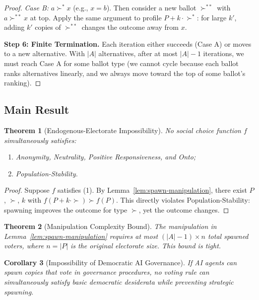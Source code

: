 \documentclass[12pt]{article}
\newtheorem{theorem}{Theorem}[section]
\newtheorem{corollary}[theorem]{Corollary}
\begin{document}
\begin{proof}
\textit{Case B:} $a \succ^* x$ (e.g., $x = b$). Then consider a new ballot $\succ^{**}$ with $a \succ^{**} x$ at top. Apply the same argument to profile $P + k \cdot \succ^*$: for large $k'$, adding $k'$ copies of $\succ^{**}$ changes the outcome away from $x$.

\textbf{Step 6: Finite Termination.}
Each iteration either succeeds (Case A) or moves to a new alternative. With $|A|$ alternatives, after at most $|A| - 1$ iterations, we must reach Case A for some ballot type (we cannot cycle because each ballot ranks alternatives linearly, and we always move toward the top of some ballot's ranking).
\end{proof}

\subsection{Main Result}

\begin{theorem}[Endogenous-Electorate Impossibility]
\label{thm:electorate-impossibility}
No social choice function $f$ simultaneously satisfies:
\begin{enumerate}
    \item Anonymity, Neutrality, Positive Responsiveness, and Onto;
    \item Population-Stability.
\end{enumerate}
\end{theorem}

\begin{proof}
Suppose $f$ satisfies (1). By Lemma~\ref{lem:spawn-manipulation}, there exist $P$, $\succ$, $k$ with $f(P + k \cdot \succ) \succ f(P)$. This directly violates Population-Stability: spawning improves the outcome for type $\succ$, yet the outcome changes.
\end{proof}

\begin{theorem}[Manipulation Complexity Bound]
\label{thm:manipulation-bound}
The manipulation in Lemma~\ref{lem:spawn-manipulation} requires at most $(|A| - 1) \times n$ total spawned voters, where $n = |P|$ is the original electorate size. This bound is tight.
\end{theorem}

\begin{corollary}[Impossibility of Democratic AI Governance]
\label{cor:democratic-ai}
If AI agents can spawn copies that vote in governance procedures, no voting rule can simultaneously satisfy basic democratic desiderata while preventing strategic spawning.
\end{corollary}
\end{document}
